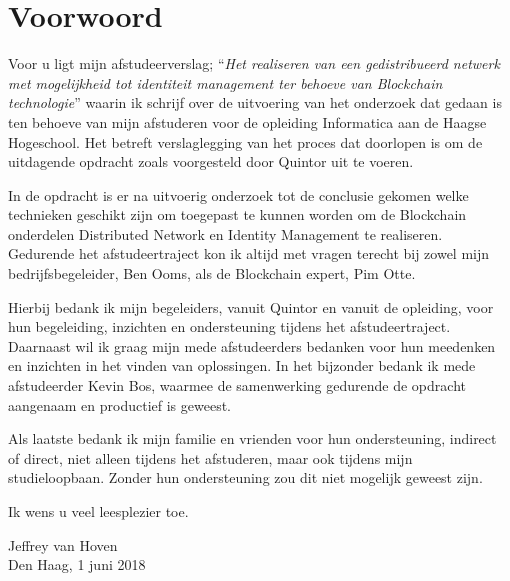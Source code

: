 \chapter*{Voorwoord}

Voor u ligt mijn afstudeerverslag; ``\textit{Het realiseren van een gedistribueerd netwerk met mogelijkheid tot identiteit management ter behoeve van Blockchain technologie}'' waarin ik schrijf over de uitvoering van het onderzoek dat gedaan is ten behoeve van mijn afstuderen voor de opleiding Informatica aan de Haagse Hogeschool. Het betreft verslaglegging van het proces dat doorlopen is om de uitdagende opdracht zoals voorgesteld door Quintor uit te voeren.

In de opdracht is er na uitvoerig onderzoek tot de conclusie gekomen welke technieken geschikt zijn om toegepast te kunnen worden om de Blockchain onderdelen Distributed Network en Identity Management te realiseren. Gedurende het afstudeertraject kon ik altijd met vragen terecht bij zowel mijn bedrijfsbegeleider, Ben Ooms, als de Blockchain expert, Pim Otte.

Hierbij bedank ik mijn begeleiders, vanuit Quintor en vanuit de opleiding, voor hun begeleiding, inzichten en ondersteuning tijdens het afstudeertraject. Daarnaast wil ik graag mijn mede afstudeerders bedanken voor hun meedenken en inzichten in het vinden van oplossingen. In het bijzonder bedank ik mede afstudeerder Kevin Bos, waarmee de samenwerking gedurende de opdracht aangenaam en productief is geweest. 

Als laatste bedank ik mijn familie en vrienden voor hun ondersteuning, indirect of direct, niet alleen tijdens het afstuderen, maar ook tijdens mijn studieloopbaan. Zonder hun ondersteuning zou dit niet mogelijk geweest zijn.

Ik wens u veel leesplezier toe.

\bigskip
\bigskip

Jeffrey van Hoven \\
Den Haag, 1 juni 2018
